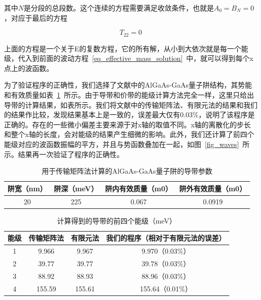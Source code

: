 \documentclass{ZJUthesis}
\begin{document}
其中$N$是分段的总段数。这个连续的方程需要满足收敛条件，也就是$A_0=B_N=0$，对应于最后的方程

\begin{equation}
    \label{eq_t22}
    T_{22}=0
\end{equation}

上面的方程是一个关于E的复数方程，它的所有解，从小到大依次就是每一个能级，代入到前面的波动方程~\ref{eq_effective_mass_solution}~中，就可以得到每个x点上的波函数。

为了验证程序的正确性，我们选择了文献中的AlGaAs-GaAs量子阱结构\cite{jonsson1990solving}，其势能和有效质量如表~\ref{tmm_sample}~所示。由于导带和价带的能级计算方法完全一样，这里只给出导带的计算结果，如表所示。我们将文献中的传输矩阵法\cite{jonsson1990solving}、有限元法\cite{nakamura1989finite}的结果和我们的结果作比较，发现结果基本上是一致的，误差最大仅有0.03\%，说明了该程序是正确的。存在的一些微小偏差主要来源于对x轴的取值不同。x轴的离散化的步长和整个x轴的长度，会对能级的结果产生细微的影响。此外，我们还计算了前四个能级对应的波函数振幅的平方，并且与势函数叠加在一起，如图~\ref{fig_waves}~所示。结果再一次验证了程序的正确性。

\begin{table}[htbp]
    \caption{用于传输矩阵法计算的AlGaAs-GaAs量子阱的导带参数}
    \centering
    \label{tmm_sample}
    \begin{tabular}{cccc}
        \hline
        阱宽（nm） & 阱深（meV） & 阱内有效质量（m0） & 阱外有效质量（m0）\\
        \hline
        20                & 225                 & 0.067                          & 0.0919\\
        \hline
    \end{tabular}
\end{table}

\begin{table}[htbp]
    \caption{计算得到的导带的前四个能级（meV）}
    \centering
    \label{tmm_sample_result}
    \begin{tabular}{cccc}
        \hline
        能级 & 传输矩阵法\cite{jonsson1990solving} & 有限元法\cite{nakamura1989finite} & 我们的程序（相对于有限元法的误差） \\
        \hline
        1       & 9.966              & 9.967            & 9.970（0.03\%） \\
        2       & 39.77              & 39.77            & 39.78（0.03\%） \\
        3       & 88.92              & 88.93            & 88.96（0.03\%） \\
        4       & 155.59            & 155.61          & 155.64（0.01\%） \\
        \hline
    \end{tabular}
\end{table}
\end{document}
